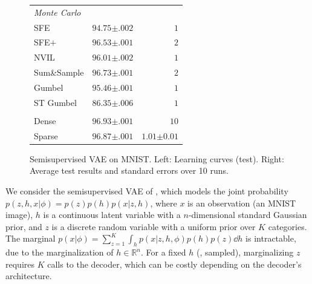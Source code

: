 \begin{figure}[t]
\begin{minipage}[c]{0.45\linewidth}
\begin{tabular}{lrr}
            \multicolumn{3}{l}{\emph{Monte Carlo}}                                              \\
            SFE
                   & $94.75${\tiny\color{gray}$\pm .002$} & $1$                                 \\
            SFE$+$
                   & $96.53${\tiny\color{gray}$\pm .001$} & $2$                                 \\
            NVIL
                   & $96.01${\tiny\color{gray}$\pm .002$} & $1$                                 \\
            Sum\&Sample
                   & $96.73${\tiny\color{gray}$\pm .001$} & $2$                                 \\
            Gumbel
                   & $95.46${\tiny\color{gray}$\pm .001$} & $1$                                 \\
            ST Gumbel
                   & $86.35${\tiny\color{gray}$\pm .006$} & $1$                                 \\
            \spacerule
            \multicolumn{3}{l}{\emph{Marginalization}}                                          \\
            Dense
                   & $96.93${\tiny\color{gray}$\pm .001$} & $10$                                \\
            Sparse {\small \color{gray}{(proposed)}}
                   & $96.87${\tiny\color{gray}$\pm .001$} & $1.01${\tiny\color{gray}$\pm 0.01$} \\
            \bottomrule
        \end{tabular}
        \vspace{5pt}
    \end{minipage}
    \caption{\label{fig:ssvaeelbo}Semisupervised VAE on MNIST.
        Left: Learning curves (test).
        Right: Average test results and standard errors over 10 runs.}
\end{figure}

We consider the semisupervised VAE of \citet{KingmaEtAl2014SSVAE},
which models the joint probability $p(z,h,x|\phi)=p(z)p(h)p(x|z,h)$, where
$x$ is an observation (an MNIST image), $h$ is a continuous latent
variable with a $n$-dimensional standard Gaussian prior, and $z$ is a
discrete random variable with a uniform prior over $K$ categories.
The marginal $p(x | \phi) = \sum_{z=1}^K \int_h p(x | z, h,
    \phi)p(h)p(z) \dd h$ is intractable, due to the marginalization of $h \in
    \mathbb R^n$. For a fixed $h$ (\eg, sampled), marginalizing $z$
requires $K$ calls to the decoder, which can be costly depending on
the decoder's architecture.

